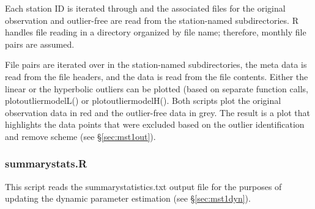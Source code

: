 Each station ID is iterated through and the associated files for the original observation and outlier-free are read from the station-named subdirectories.  
R handles file reading in a directory organized by file name; therefore, monthly file pairs are assumed.

File pairs are iterated over in the station-named subdirectories, the meta data is read from the file headers, and the data is read from the file contents.  
Either the linear or the hyperbolic outliers can be plotted (based on separate function calls, plot\textunderscore outlier\textunderscore modelL() or plot\textunderscore outlier\textunderscore modelH().  
Both scripts plot the original observation data in red and the outlier-free data in grey.  
The result is a plot that highlights the data points that were excluded based on the outlier identification and remove scheme (see \S \ref{sec:mst1out}).

\subsubsection{summary\textunderscore stats.R}
\label{sec:modelstr}
This script reads the summary\textunderscore statistics.txt output file for the purposes of updating the dynamic parameter estimation (see \S \ref{sec:mst1dyn}).  

